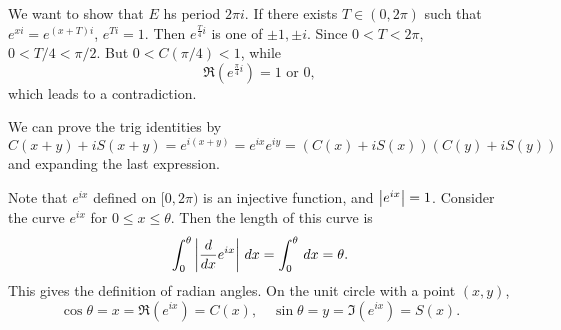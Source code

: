 We want to show that \(E\) hs period \(2\pi i\). If there exists \(T \in (0, 2\pi)\) such that \(e^{xi} = e^{(x+T)i}\), \(e^{Ti} = 1\). Then \(e^{\frac{T}{4}i}\) is one of \(\pm 1, \pm i\). Since \(0 < T < 2\pi\), \(0 < T/4 < \pi/2\). But \(0 < C(\pi/4) < 1\), while
\[
    \Re(e^{\frac{\pi}{4}i}) = 1 \text{ or } 0,
\]
which leads to a contradiction.

We can prove the trig identities by
\[
    C(x+y) + i S(x+y) = e^{i(x+y)} = e^{ix}e^{iy} = (C(x) + iS(x))(C(y) + iS(y))
\]
and expanding the last expression.

Note that \(e^{ix}\) defined on \([0, 2\pi)\) is an injective function, and \(\left| e^{ix} \right| = 1\). Consider the curve \(e^{ix}\) for \(0 \leq x \leq \theta\). Then the length of this curve is
\[
    \int_0^\theta \left| \frac{d}{dx}e^{ix} \right|\,d{x} = \int_0^\theta \,d{x} = \theta.
\]
This gives the definition of radian angles. On the unit circle with a point \((x, y)\),
\[
    \cos \theta = x = \Re(e^{ix}) = C(x),\quad \sin\theta = y = \Im(e^{ix}) = S(x).
\]

\pagebreak
